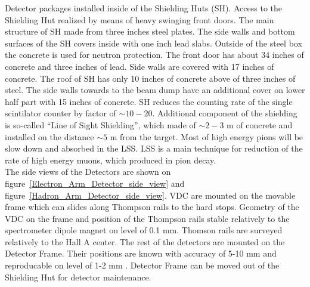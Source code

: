 \documentclass[12pt]{article}
\begin{document}
Detector packages installed inside of the Shielding Huts (SH). Access to the Shielding Hut 
realized by means of heavy swinging front doors. The main structure of SH made from three
inches steel plates. The side walls and bottom surfaces of the SH covers inside with one inch
lead slabs. Outside of the steel box the concrete is used for neutron protection. 
The front door has about 34 inches of concrete and three inches of lead. Side walls are 
covered with 17 inches of concrete. The roof of SH has only 10 inches of concrete above 
of three inches of steel. The side walls towards to the beam dump have an additional cover on lower 
half part with 15 inches of concrete.
SH reduces the counting rate of the single scintilator counter by factor of $\sim 10-20$.
Additional component of the shielding is so-called
``Line of Sight Shielding'', which made of $\sim 2-3$ m of concrete and installed on the distance 
$\sim 5$ m from the target. Most of high energy pions will be slow down and absorbed in the LSS.    
LSS is a main technique for reduction of the rate of high energy muons, which produced in pion decay.\\
  
The side views of the Detectors are shown on figure~\ref{Electron_Arm_Detector_side_view} and 
figure~\ref{Hadron_Arm_Detector_side_view}. VDC are mounted on the movable frame which can 
slides along Thompson rails to the hard stops. Geometry of the VDC on the frame and  position of the 
Thompson rails stable relatively to the spectrometer dipole magnet on level of 0.1 mm. Thomson rails are
surveyed relatively to the Hall A center. The rest of the detectors are mounted 
on the Detector Frame. Their positions are known with accuracy of 5-10 mm and
reproducable on level of 1-2 mm . Detector Frame can be moved out of the Shielding Hut 
for detector maintenance.   
\end{document}
